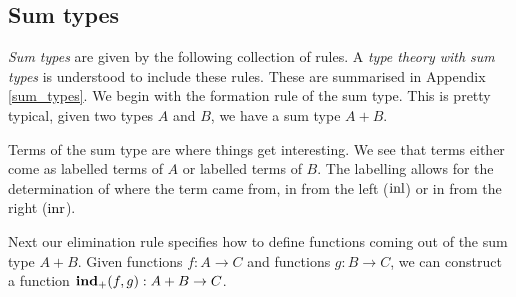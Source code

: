 \subsection{Sum types}

\begin{defin}\label{sum_type}
    \emph{Sum types} are given by the following collection of rules. A \emph{type theory with sum types} is understood to include these rules. These are summarised in Appendix \ref{sum_types}. 
    We begin with the formation rule of the sum type. This is pretty typical, given two types $A$ and $B$, we have a sum type $A + B$.
    \begin{prooftree}
    \end{prooftree}

    Terms of the sum type are where things get interesting. We see that terms either come as labelled terms of $A$ or labelled terms of $B$. The labelling allows for the determination of where the term came from, in from the left ($\inl$) or in from the right ($\inr$).

    \begin{prooftree}
    \end{prooftree}

    \begin{prooftree}
    \end{prooftree}

    Next our elimination rule specifies how to define functions coming out of the sum type $A + B$. Given functions $f : A \to C$ and functions $g : B \to C$, we can construct a function $\indp(f,g) : A + B \to C$.

    \begin{prooftree}
    \end{prooftree}


\end{defin}

